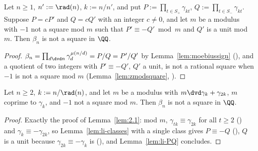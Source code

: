 \begin{lemma}
  \label{lem:li-PQ}
  \leanok
  Let $n \ge 1$, $n' := \rad(n)$, $k := n/n'$, and put $P := \prod_{t \in S_+} \gamma_{kt}$,
  $Q := \prod_{t \in S_-} \gamma_{kt}$. Suppose $P = c P'$ and $Q = c Q'$ with an integer
  $c \ne 0$, and let $m$ be a modulus with $-1$ not a square mod $m$ such that
  $P' \equiv -Q' \bmod m$ and $Q'$ is a unit mod $m$. Then $\beta_n$ is not a square in $\QQ$.
\end{lemma}
\begin{proof}
  \leanok
  $\beta_n = \prod_{d \dvd n} \gamma_d^{\mu(n/d)} = P/Q = P'/Q'$ by
  Lemma~\ref{lem:moebiussign} (), and a quotient of two
  integers with $P' \equiv -Q'$, $Q'$ a unit, is not a rational square when $-1$ is not a square
  mod $m$ (Lemma~\ref{lem:zmodsquare}, ).
\end{proof}

\begin{lemma}
  \label{lem:li-crit}
  \leanok
  Let $n \ge 2$, $k := n/\rad(n)$, and let $m$ be a modulus with $m \dvd \gamma_k + \gamma_{2k}$,
  $m$ coprime to $\gamma_k$, and $-1$ not a square mod $m$. Then $\beta_n$ is not a square in
  $\QQ$.
\end{lemma}
\begin{proof}
  \leanok
  Exactly the proof of Lemma~\ref{lem:2.1}: mod $m$, $\gamma_{tk} \equiv \gamma_{2k}$ for all
  $t \ge 2$ () and $\gamma_k \equiv -\gamma_{2k}$, so
  Lemma~\ref{lem:li-classes} with a single class gives $P \equiv -Q$
  (), $Q$ is a unit because
  $\gamma_{2k} \equiv -\gamma_k$ is (), and
  Lemma~\ref{lem:li-PQ} concludes.
\end{proof}

